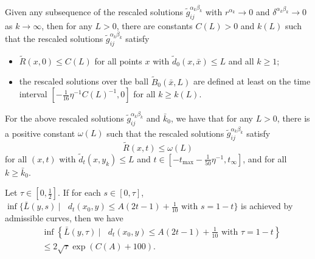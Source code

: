 \begin{lemma}
  \label{lem:cz-rescaled-balls-uniform-curvature-backward-existence}
Given any subsequence of the rescaled
solutions $\tilde{g}^{\alpha_k\beta_k}_{ij}$ with
$r^{\alpha_k}\rightarrow 0$ and
$\delta^{\alpha_k\beta_k}\rightarrow 0$ as $k\rightarrow \infty$,
then for any $L>0$, there are constants $C(L)>0$ and $k(L)$ such
that the rescaled solutions $\tilde{g}^{\alpha_k\beta_k}_{ij}$
satisfy
\begin{itemize}
\item[(i)] $\tilde{R}(x,0)\leq C(L)$ for all points $x$ with
$\tilde{d}_{0}(x,\bar{x})\leq L$ and all $k \geq 1$; \item[(ii)]
the rescaled solutions over the ball $\tilde{B}_{0}(\bar{x},L)$
are defined at least on the time interval
$[-\frac{1}{16}\eta^{-1}C(L)^{-1},0]$ for all $k\geq k(L)$.
\end{itemize}

\end{lemma}
\begin{lemma}
  \label{lem:cz-extended-limit-uniform-spacetime-curvature}
For the above rescaled solutions
$\widetilde{g}^{\alpha_k\beta_k}_{ij}$ and $\bar{k}_0$, we have
that for any $L>0$, there is a positive constant $\omega(L)$ such
that the rescaled solutions $\widetilde{g}^{\alpha_k\beta_k}_{ij}$
satisfy
$$
\widetilde{R}(x,t)\leq\omega(L)
$$
for all $(x,t)$ with $\tilde{d}_{t}(x,y_k)\leq L$ and $t\in
[-t_{\max}-\frac{1}{50}\eta^{-1},t_{\infty}]$, and for all $k \geq
\bar{k}_0$.

\end{lemma}
\begin{lemma}
  \label{lem:cz-admissible-minimizer-reduced-length-bound}
Let $\tau\in[0,\frac{1}{2}]$. If for each
$s\in[0,\tau]$, $\inf\{\bar{L}(y,s)\ |\ \mbox{ } d_t(x_0,y)\leq
A(2t-1)+\frac{1}{10}\mbox{ with }s=1-t\}$ is achieved by
admissible curves, then we have
\begin{align}
&\inf\left\{\bar{L}(y,\tau)\ |\ \mbox{ } d_t(x_0,y)
\leq A(2t-1)+\frac{1}{10}\mbox{ with }\tau=1-t\right\}\\
&\leq 2\sqrt{\tau}\exp(C(A)+100). \nonumber  %
\end{align}
\end{lemma}
